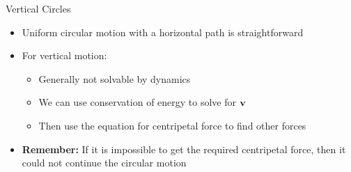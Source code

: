 \documentclass[12pt,compress,aspectratio=169]{beamer}
\newcommand{\mb}[1]{\ensuremath\mathbf{#1}}
\begin{document}
\begin{frame}{Vertical Circles}
  \begin{itemize}
  \item Uniform circular motion with a horizontal path is straightforward
  \item For vertical motion:
    \begin{itemize}
    \item Generally not solvable by dynamics
    \item We can use conservation of energy to solve for $\mb{v}$
    \item Then use the equation for centripetal force to find other forces
    \end{itemize}
  \item\textbf{Remember:} If it is impossible to get the required centripetal
    force, then it could not continue the circular motion
  \end{itemize}
\end{frame}
\end{document}

